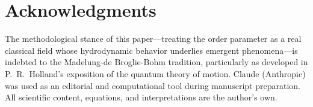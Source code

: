 \documentclass[12pt, a4paper]{article}
\begin{document}
\section*{Acknowledgments}

The methodological stance of this paper---treating the order parameter as a real classical field whose hydrodynamic behavior underlies emergent phenomena---is indebted to the Madelung-de Broglie-Bohm tradition, particularly as developed in P.~R.~Holland's exposition of the quantum theory of motion. Claude (Anthropic) was used as an editorial and computational tool during manuscript preparation. All scientific content, equations, and interpretations are the author's own.
\end{document}
